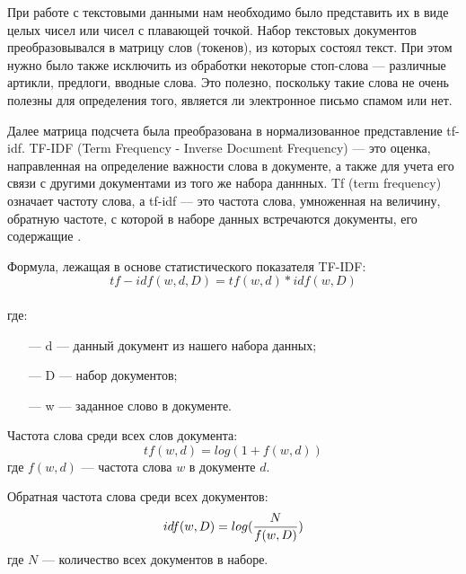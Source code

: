При работе с текстовыми данными нам необходимо было представить их в виде целых чисел или чисел с плавающей точкой.
Набор текстовых документов преобразовывался в матрицу слов (токенов), из которых состоял текст. При этом нужно было также
исключить из обработки некоторые стоп-слова — различные артикли, предлоги, вводные слова. Это полезно,
поскольку такие слова не очень полезны для определения того, является ли электронное письмо спамом или нет.

Далее матрица подсчета была преобразована в нормализованное представление tf-idf. 
TF-IDF (Term Frequency - Inverse Document Frequency) — это оценка, направленная на определение важности слова
в документе, а также для учета его связи с другими документами из того же набора даннных. Tf (term frequency)
означает частоту слова, а tf-idf — это частота слова, умноженная на величину, обратную частоте,
с которой в наборе данных встречаются документы, его содержащие \cite{Manning}.

Формула, лежащая в основе статистического показателя TF-IDF:
\begin{equation}\label{eq15}
    tf-idf(w, d, D) = tf(w, d) * idf(w, D)
\end{equation}
\\
где:

\begin{itemize}
    \item[—] d — данный документ из нашего набора данных;
    \item[—] D — набор документов;
    \item[—] w — заданное слово в документе.
\end{itemize}

Частота слова среди всех слов документа:
\begin{equation}\label{eq16}
    tf(w, d) = log(1 + f(w, d))
\end{equation}
где $f(w, d)$ — частота слова $w$ в документе $d$.

Обратная частота слова среди всех документов:
\begin{equation}\label{eq17}
    idf(w, D) = log({{N}\over{f(w, D)}})
\end{equation}
где $N$ — количество всех документов в наборе.
